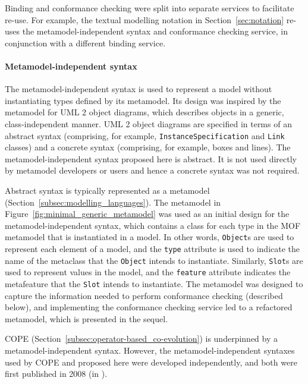 Binding and conformance checking were split into separate services to facilitate re-use. For example, the textual modelling notation in Section~\ref{sec:notation} re-uses the metamodel-independent syntax and conformance checking service, in conjunction with a different binding service.

\paragraph{Metamodel-independent syntax} The metamodel-independent syntax is used to represent a model without instantiating types defined by its metamodel. Its design was inspired by the metamodel for UML 2 \cite{uml212} object diagrams, which describes objects in a generic, class-independent manner. UML 2 object diagrams are specified in terms of an abstract syntax (comprising, for example, \texttt{InstanceSpecification} and \texttt{Link} classes) and a concrete syntax (comprising, for example, boxes and lines). The metamodel-independent syntax proposed here is abstract. It is not used directly by metamodel developers or users and hence a concrete syntax was not required.

Abstract syntax is typically represented as a metamodel (Section~\ref{subsec:modelling_languages}). The metamodel in Figure~\ref{fig:minimal_generic_metamodel} was used as an initial design for the metamodel-independent syntax, which contains a class for each type in the MOF metamodel that is instantiated in a model. In other words, \texttt{Ob\-je\-ct}s are used to represent each element of a model, and the \texttt{ty\-pe} attribute is used to indicate the name of the metaclass that the \texttt{Ob\-je\-ct} intends to instantiate. Similarly, \texttt{Sl\-ot}s are used to represent values in the model, and the \texttt{feature} attribute indicates the metafeature that the \texttt{Sl\-ot} intends to instantiate. The metamodel was designed to capture the information needed to perform conformance checking (described below), and implementing the conformance checking service led to a refactored metamodel, which is presented in the sequel.

COPE (Section~\ref{subsec:operator-based_co-evolution}) is underpinned by a metamodel-independent syntax. However, the metamodel-independent syntaxes used by COPE and proposed here were developed independently, and both were first published in 2008 (in \cite{rose08hutn,herrmannsdoerfer08cope}).

